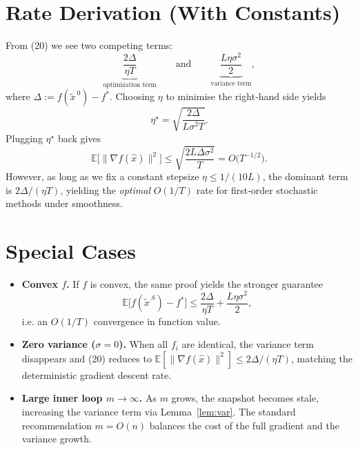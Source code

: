 \documentclass[11pt]{article}
\newcommand{\EE}{\mathbb{E}}
\newcommand{\grad}{\nabla}
\begin{document}
\section*{Rate Derivation (With Constants)}
From (20) we see two competing terms:
\[
\underbrace{\frac{2\Delta}{\eta T}}_{\text{optimization term}}
\qquad\text{and}\qquad
\underbrace{\frac{L\eta\sigma^{2}}{2}}_{\text{variance term}},
\]
where $\Delta:=f(\tilde{x}^{\,0})-f^{*}$.  
Choosing $\eta$ to minimise the right‑hand side yields
\[
\eta^{\star}= \sqrt{\frac{2\Delta}{L\sigma^{2}T}}.
\]
Plugging $\eta^{\star}$ back gives
\[
\EE\!\big[\|\grad f(\hat{x})\|^{2}\big]\le
\sqrt{\frac{2L\Delta\sigma^{2}}{T}}=O\!\big(T^{-1/2}\big).
\]
However, as long as we fix a constant stepsize $\eta\le 1/(10L)$, the dominant term is $2\Delta/(\eta T)$, yielding the \emph{optimal} $O(1/T)$ rate for first‑order stochastic methods under smoothness.

\section*{Special Cases}
\begin{itemize}[leftmargin=*]
\item \textbf{Convex $f$.} If $f$ is convex, the same proof yields the stronger guarantee
\[
\EE\!\big[f(\tilde{x}^{\,S})-f^{*}\big]\le\frac{2\Delta}{\eta T}+\frac{L\eta\sigma^{2}}{2},
\]
i.e. an $O(1/T)$ convergence in function value.
\item \textbf{Zero variance ($\sigma=0$).} When all $f_i$ are identical, the variance term disappears and (20) reduces to $\EE[\|\grad f(\hat{x})\|^{2}]\le 2\Delta/(\eta T)$, matching the deterministic gradient descent rate.
\item \textbf{Large inner loop $m\to\infty$.} As $m$ grows, the snapshot becomes stale, increasing the variance term via Lemma~\ref{lem:var}. The standard recommendation $m=O(n)$ balances the cost of the full gradient and the variance growth.
\end{itemize}
\end{document}
